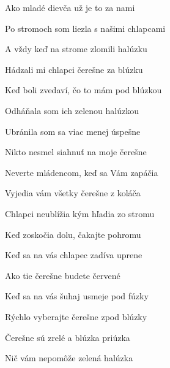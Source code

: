 \begin{song}


\begin{hchordbox}
\end{hchordbox}

\Large

\bigskip

 Ako mladé dievča  už je to  za nami \par
{} Po stromoch som liezla  s našimi  chlapcami \par
{}A vždy keď na strome zlomili halúzku \par
{}Hádzali mi chlapci čerešne za blúzku \par
{}Keď boli zvedaví, čo to mám pod blúzkou \par
{}Odháňala som ich zelenou halúzkou \par

\bigskip


\bigskip

 Ubránila som sa  viac menej  úspešne \par
{} Nikto nesmel siahnuť  na moje  čerešne \par
{}Neverte mládencom, keď sa Vám zapáčia \par
{}Vyjedia vám všetky čerešne z koláča \par
{}Chlapci neublížia kým hľadia zo stromu \par
{}Keď zoskočia dolu, čakajte pohromu \par

\bigskip


\bigskip

 Keď sa na vás chlapec  zadíva  uprene \par
{} Ako tie čerešne  budete  červené \par
{}Keď sa na vás šuhaj usmeje pod fúzky \par
{}Rýchlo vyberajte čerešne zpod blúzky \par
{}Čerešne sú zrelé a blúzka priúzka \par
{}Nič vám nepomôže zelená halúzka \par

\end{song}